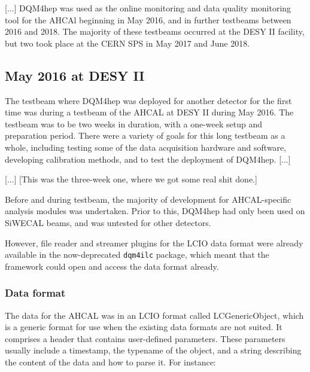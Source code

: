 [...] DQM4hep was used as the online monitoring and data quality monitoring tool for the AHCAl beginning in May 2016, and in further testbeams between 2016 and 2018. The majority of these testbeams occurred at the DESY II facility, but two took place at the CERN SPS in May 2017 and June 2018.

\subsection{May 2016 at DESY II}
The testbeam where DQM4hep was deployed for another detector for the first time was during a testbeam of the AHCAL at DESY II during May 2016. The testbeam was to be two weeks in duration, with a one-week setup and preparation period. There were a variety of goals for this long testbeam as a whole, including testing some of the data acquisition hardware and software, developing calibration methods, and to test the deployment of DQM4hep. [...]


[...] [This was the three-week one, where we got some real shit done.]

Before and during testbeam, the majority of development for AHCAL-specific analysis modules was undertaken. Prior to this, DQM4hep had only been used on SiWECAL beams, and was untested for other detectors. 

However, file reader and streamer plugins for the LCIO data format were already available in the now-deprecated \texttt{dqm4ilc} package, which meant that the framework could open and access the data format already.

\subsubsection{Data format}
The data for the AHCAL was in an LCIO format called LCGenericObject, which is a generic format for use when the existing data formats are not suited. It comprises a header that contains user-defined parameters. These parameters usually include a timestamp, the typename of the object, and a string describing the content of the data and how to parse it. For instance:

